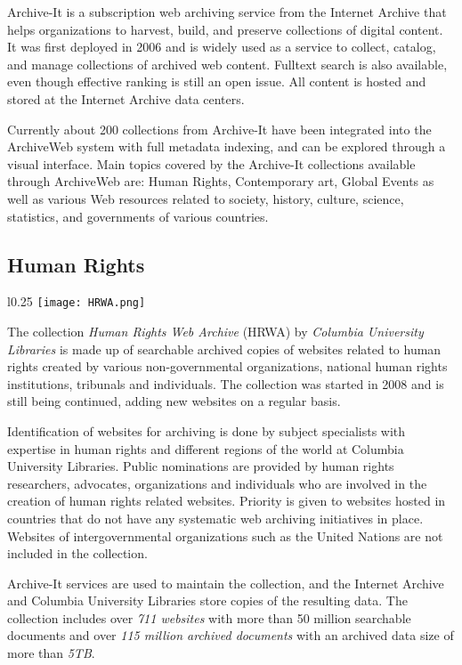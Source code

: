 \documentclass{llncs}
\begin{document}
Archive-It is a subscription web archiving service from the Internet
Archive that helps organizations to harvest, build, and preserve
collections of digital content. It was first deployed in 2006 and is
widely used as a service to collect, catalog, and manage
collections of archived web content. Fulltext search is also
available, even though effective ranking is still an open issue.  All
content is hosted and stored at the Internet Archive data centers.

Currently about 200 collections from Archive-It have been integrated
into the ArchiveWeb system with full metadata indexing, and can be
explored through a visual interface. Main topics covered by the
Archive-It collections available through ArchiveWeb are: Human Rights,
Contemporary art, Global Events as well as various Web resources  related to society, history, culture, science, statistics, and
governments of various countries.

\subsection{Human Rights}

\begingroup

\setlength{\intextsep}{5pt}
\begin{wrapfigure}{l}{0.25\textwidth}
\texttt{[image: HRWA.png]} 
\label{hrwa}
\end{wrapfigure}

The collection \textit{Human Rights Web Archive} (HRWA) by
\textit{Columbia University Libraries} is made up of searchable
archived copies of websites related to human rights created by various
non-governmental organizations, national human rights institutions,
tribunals and individuals. The collection was started in 2008 and is still
being continued, adding new websites on a regular
basis. 

Identification of websites for archiving is done by subject
specialists with expertise in human rights and different regions of
the world at Columbia University Libraries. Public nominations are
provided by human rights researchers, advocates, organizations and
individuals who are involved in the creation of human rights related
websites. Priority is given to websites hosted in countries that do
not have any systematic web archiving initiatives in place. Websites
of intergovernmental organizations such as the United Nations are not
included in the collection.

Archive-It services are used to maintain the
collection, and the Internet Archive and Columbia University Libraries
store copies of the resulting data. The collection includes over \textit{711
  websites} with more than 50 million searchable documents and over
\textit{115 million archived documents} with an archived data size of
more than \textit{5TB}.
\end{document}
